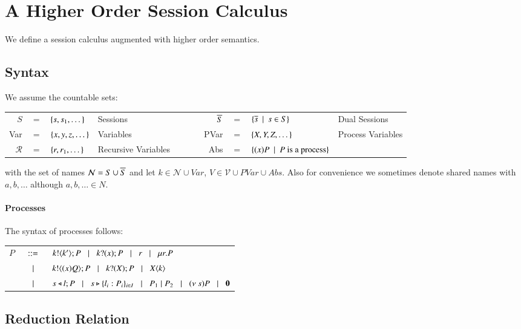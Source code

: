 \section{A Higher Order Session Calculus}

We define a session calculus augmented with higher order semantics.

\subsection{Syntax}

We assume the countable sets:

\begin{tabular}{rcllcrcll}
	$S$ &$=$& $\{s, s_1, \dots\}$ & Sessions
	&$\qquad$&
	$\overline{S}$ &$=$& $\{\overline{s} \ \ |\ \  s \in S\}$ & Dual Sessions
	\\

	Var &$=$& $\{x,y,z, \dots\}$ & Variables
	&$\qquad$&
	PVar &$=$& $\{X, Y, Z, \dots\}$ & Process Variables\\

	$\mathcal{R}$ &$=$& $\{r, r_1, \dots\}$ & Recursive Variables
	&$\qquad$&
	Abs &$=$& $\{(x)P \ \ |\ \  P \textrm{ is a process}\}$
\end{tabular}

with the set of names $\mathcal{N} = S \cup \overline{S}$ and let $k \in \mathcal{N} \cup Var$,
$V \in \mathcal{V} \cup PVar \cup Abs$.
Also for convenience we sometimes denote shared names with $a, b, \dots$ although $a,b,\dots \in N$.

\paragraph{Processes}

The syntax of processes follows:

\begin{tabular}{rcl}
	$P$	&$\;\;::=\;\;$&	$k ! \langle k' \rangle ; P \;\;\;|\;\;\; k ? (x) ; P \;\;\;|\;\;\; r \;\;\;|\;\;\; \mu r. P$\\
		&$\;\;\;|\;\;\;$&	$k ! \langle (x)Q \rangle ; P \;\;\;|\;\;\; k ? (X) ; P \;\;\;|\;\;\; X\langle k \rangle$\\ 
		&$\;\;\;|\;\;\;$&	$s \triangleleft l ; P \;\;\;|\;\;\; s \triangleright \{l_i:P_i\}_{i \in I} \;\;\;|\;\;\; 
				P_1 \;|\; P_2 \;\;\;|\;\;\; (\nu\ s) P \;\;\;|\;\;\; \mathbf{0}$
\end{tabular}


\subsection{Reduction Relation}

